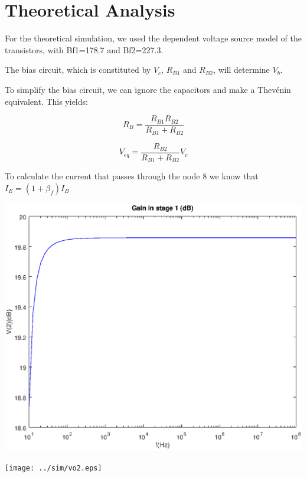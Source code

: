 \section{Theoretical Analysis}
\label{sec:analysis}

For the theoretical simulation, we used the dependent voltage source model of the transistors, with Bf1=178.7 and Bf2=227.3.

The bias circuit, which is constituted by $V_c$, $R_{B1}$ and $R_{B2}$, will determine $V_b$.

To simplify the bias circuit, we can ignore the capacitors and make a Thevénin equivalent. This yields:

\begin{equation}
	R_B=\frac{R_{B1} R_{B2}}{R_{B1}+R_{B2}}
\end{equation}

\begin{equation}
	V_{eq}= \frac{R_{B2}}{R_{B1}+R_{B2}} V_{c}
\end{equation}

To calculate the current that passes through the node 8 we know that $I_E= (1+\beta_f)I_B$

\includegraphics[width=1\linewidth]{../mat/vo1.eps}

\texttt{[image: ../sim/vo2.eps]}


